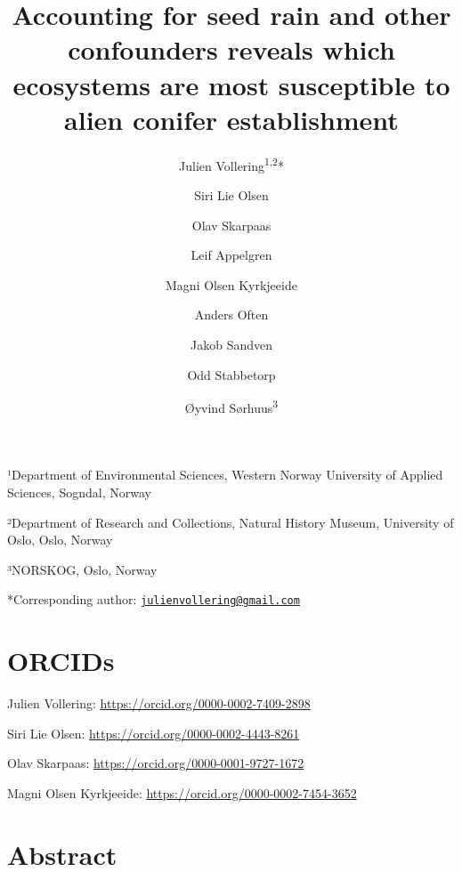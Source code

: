 \documentclass[
]{article}
\title{Accounting for seed rain and other confounders reveals which ecosystems are most susceptible to alien conifer establishment}
\author{Julien Vollering\textsuperscript{1,2}* \and Siri Lie Olsen \and Olav Skarpaas \and Leif Appelgren \and Magni Olsen Kyrkjeeide \and Anders Often \and Jakob Sandven \and Odd Stabbetorp \and Øyvind Sørhuus\textsuperscript{3}}
\date{}
\begin{document}
\maketitle

¹Department of Environmental Sciences, Western Norway University of Applied Sciences, Sogndal, Norway

²Department of Research and Collections, Natural History Museum, University of Oslo, Oslo, Norway

³NORSKOG, Oslo, Norway

*Corresponding author: \href{mailto:julienvollering@gmail.com}{\nolinkurl{julienvollering@gmail.com}}

\hypertarget{orcids}{%
\section{ORCIDs}\label{orcids}}

Julien Vollering: \url{https://orcid.org/0000-0002-7409-2898}

Siri Lie Olsen: \url{https://orcid.org/0000-0002-4443-8261}

Olav Skarpaas: \url{https://orcid.org/0000-0001-9727-1672}

Magni Olsen Kyrkjeeide: \url{https://orcid.org/0000-0002-7454-3652}

\hypertarget{abstract}{%
\section{Abstract}\label{abstract}}
\end{document}
